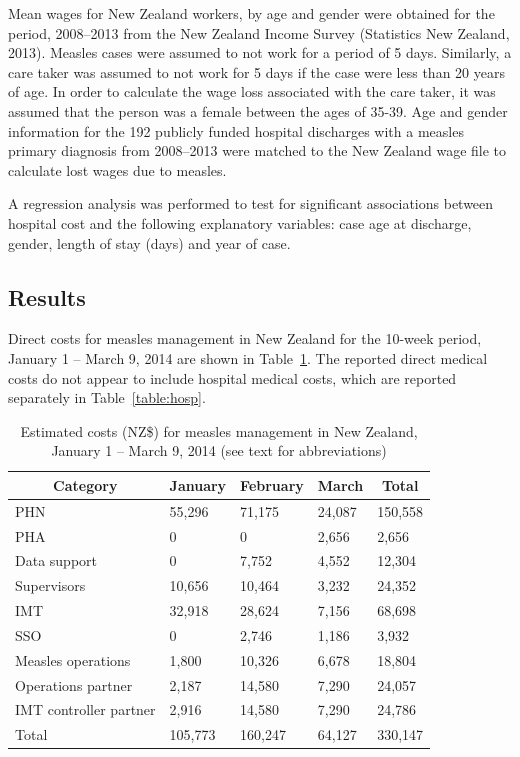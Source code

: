 \documentclass{article}
\begin{document}
{Mean wages for New Zealand workers, by age and gender were obtained for the period, 2008--2013 from the New Zealand Income Survey (Statistics New Zealand, 2013). Measles cases were assumed to not work for a period of 5 days. Similarly, a care taker was assumed to not work for 5 days if the case were less than 20 years of age. In order to calculate the wage loss associated with the care taker, it was assumed that the person was a female between the ages of 35-39. Age and gender information for the 192 publicly funded hospital discharges with a measles primary diagnosis from 2008--2013 were matched to the New Zealand wage file to calculate lost wages due to measles.

A regression analysis was performed to test for significant associations between hospital cost and the following explanatory variables: case age at discharge, gender, length of stay (days) and year of case.

\subsection{Results}
Direct costs for measles management in New Zealand for the 10-week period, January 1 -- March 9, 2014 are shown in  Table~\ref{table:direct}. The reported direct medical costs do not appear to include hospital medical costs, which are reported separately in Table~\ref{table:hosp}. 


\begin{table}
\caption{Estimated costs (NZ\$) for measles management in New Zealand, January 1 -- March 9, 2014 (see text for abbreviations)}
\begin{center}
\begin{tabular}{lllll}
\hline\hline
\multicolumn{1}{c}{Category}&\multicolumn{1}{c}{January}&\multicolumn{1}{c}{February}&\multicolumn{1}{c}{March}&\multicolumn{1}{c}{Total}\tabularnewline
\hline
PHN&55,296&71,175&24,087&150,558\tabularnewline
PHA&0&0&2,656&2,656\tabularnewline
Data support&0&7,752&4,552&12,304\tabularnewline
Supervisors&10,656&10,464&3,232&24,352\tabularnewline
IMT&32,918&28,624&7,156&68,698\tabularnewline
SSO&0&2,746&1,186&3,932\tabularnewline
Measles operations&1,800&10,326&6,678&18,804\tabularnewline
Operations partner&2,187&14,580&7,290&24,057\tabularnewline
IMT controller partner&2,916&14,580&7,290&24,786\tabularnewline
Total&105,773&160,247&64,127&330,147\tabularnewline
\hline
\end{tabular}\end{center}\label{table:direct}
\end{table}

}
\end{document}

